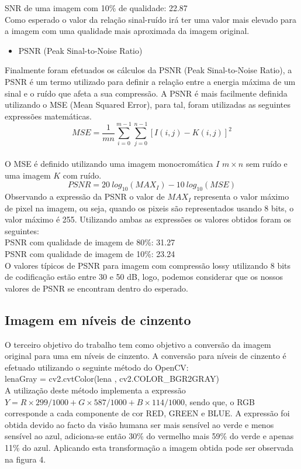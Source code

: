 \documentclass[12pt,a4paper]{article}
\begin{document}
SNR de uma imagem com 10\% de qualidade: 22.87\\
\newline
Como esperado o valor da relação sinal-ruído irá ter uma valor mais elevado para a imagem com uma qualidade mais aproximada da imagem original.\\
\begin{itemize}
\item {PSNR (Peak Sinal-to-Noise Ratio)}
\end{itemize}
Finalmente foram efetuados os cálculos da PSNR (Peak Sinal-to-Noise Ratio), a PSNR é um termo utilizado para definir a relação entre a energia máxima de um sinal e o ruído que afeta a sua compressão. A PSNR é mais facilmente definida utilizando o MSE (Mean Squared Error), para tal, foram utilizadas as seguintes expressões matemáticas.\\
\newline
\[
MSE = \frac{1}{mn}\sum_{i=0}^{m-1}\sum_{j=0}^{n-1}\left [ I(i,j) - K(i,j)  \right]^2
\]\\
O MSE é definido utilizando uma imagem monocromática $I$ $m\times n$ sem ruído e uma imagem $K$ com ruído.
\[
PSNR = 20\: log_{10}(MAX_I) - 10\: log_{10}(MSE)
\]
Observando a expressão da PSNR o valor de $MAX_I$ representa o valor máximo de pixel na imagem, ou seja, quando os pixeis são representados usando 8 bits, o valor máximo é 255. Utilizando ambas as expressões os valores obtidos foram os seguintes:\\
\newline
PSNR com qualidade de imagem de 80\%: 31.27\\
PSNR com qualidade de imagem de 10\%: 23.24\\
\newline
O valores típicos de PSNR para imagem com compressão lossy utilizando 8 bits de codificação estão entre 30 e 50 dB, logo, podemos considerar que os nossos valores de PSNR se encontram dentro do esperado.

\subsection{Imagem em níveis de cinzento}
O terceiro objetivo do trabalho tem como objetivo a conversão da imagem original para uma em níveis de cinzento. A conversão para níveis de cinzento é efetuado utilizando o seguinte método do OpenCV:\\
\newline
lenaGray = cv2.cvtColor(lena , cv2.COLOR\_BGR2GRAY)\\
\newline
A utilização deste método implementa a expressão $Y = R\times 299/1000 + G\times 587/1000 + B\times 114/1000$, sendo que, o RGB corresponde a cada componente de cor RED, GREEN e BLUE. A expressão foi obtida devido ao facto da visão humana ser mais sensível ao verde e menos sensível ao azul, adiciona-se então 30\% do vermelho mais 59\% do verde e apenas 11\% do azul. Aplicando esta transformação a imagem obtida pode ser observada na figura 4.
\end{document}

